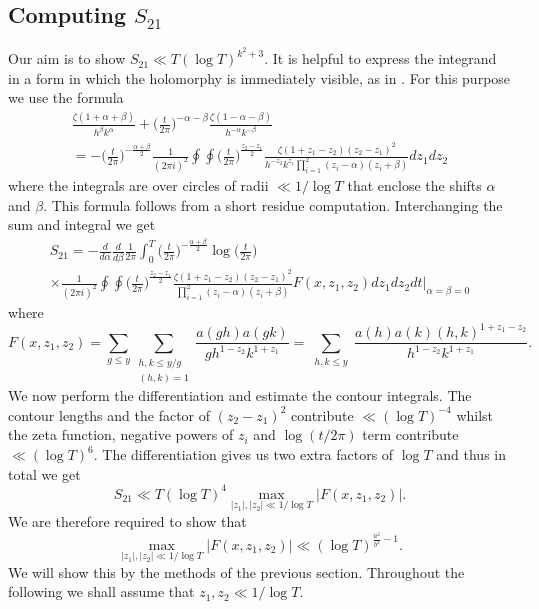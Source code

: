 \documentclass[oneside, 12pt]{amsart}
\theoremstyle{definition}
\newcommand{\leqs}{\leqslant }
\begin{document}
\subsection{Computing $S_{21}$}




Our aim is to show $S_{21}\ll T(\log T)^{ k^2+3 }$. It is helpful to express the integrand in a form in which the holomorphy is immediately visible, as in \cite{CFKRS}. For this purpose we use the formula
\begin{multline}\label{contour int rep}
\frac{\zeta(1+\alpha+\beta)}{h^{\beta}k^{\alpha}}
      + \bigg(\frac{t}{2\pi}\bigg)^{-\alpha-\beta}
             \frac{\zeta(1-\alpha-\beta)}{h^{-\alpha}k^{-\beta}} \\
=-\Big( \frac{t}{2\pi} \Big)^{ -\frac{\alpha+\beta}{2} }  
    \frac{1}{ (2\pi i )^2 } \oint\!\!\!\oint \bigg(\frac{t}{2\pi}\bigg)^{\frac{z_2-z_1}{2}}\frac{ \zeta(1+z_1-z_2)(z_2-z_1)^2 }{h^{-z_2}k^{z_1}\prod_{i=1}^2(z_i-\alpha)(z_i+\beta)}dz_1dz_2
\end{multline}
where the integrals are over circles of radii $\ll 1/\log T$ that enclose the shifts $\alpha$ and $\beta$. This formula follows from a short residue computation. Interchanging the sum and integral we get 
\begin{multline*}
S_{21} = -  \frac{d}{d\alpha}\frac{d}{d\beta}  
                \frac{1}{2\pi}\int_0^T 
                  \Big( \frac{t}{2\pi} \Big)^{ -\frac{\alpha+\beta}{2} }  
                  \log\bigg(\frac{t}{2\pi}\bigg)
          \\
                \times
                  \frac{1}{ (2\pi i )^2 } \oint\!\!\!\oint \bigg(\frac{t}{2\pi}\bigg)^{\frac{z_2-z_1}{2}}
                  \frac{ \zeta(1+z_1-z_2)(z_2-z_1)^2 }{\prod_{i=1}^2(z_i-\alpha)(z_i+\beta)}      
                  F(x,z_1,z_2)
                dz_1dz_2    dt
               \bigg|_{\alpha=\beta=0}
\end{multline*}
where 
\[
F(x,z_1,z_2) = \sum_{g\leqs y}\sum_{\substack{h,k\leqs y/g\\(h,k)=1}}\frac{a(gh)a(gk)}{gh^{1-z_2}k^{1+z_1}}
                     = \sum_{\substack{h,k\leqs y}}\frac{a(h)a(k)(h,k)^{1+z_1-z_2}}{h^{1-z_2}k^{1+z_1}}.
\]
We now perform the differentiation and estimate the contour integrals. The contour lengths and the factor of $(z_2-z_1)^2$ contribute $\ll(\log T)^{-4}$ whilst the zeta function, negative powers of $z_i$ and $\log(t/2\pi )$ term contribute $\ll (\log T)^6$. The differentiation gives us two extra factors of $\log T$ and thus in total we get 
\[
S_{21}\ll T(\log T)^4 \max_{|z_1|,|z_2|\ll 1/\log T}|F(x,z_1,z_2)|.
\]
We are therefore required to show that 
\[
\max_{|z_1|,|z_2|\ll 1/\log T}|F(x,z_1,z_2)|\ll (\log T)^{\frac{a^2}{b^2}-1}.
\]
We will show this by the methods of the previous section. Throughout the following we shall assume that $z_1,z_2\ll 1/\log T$.
\end{document}
